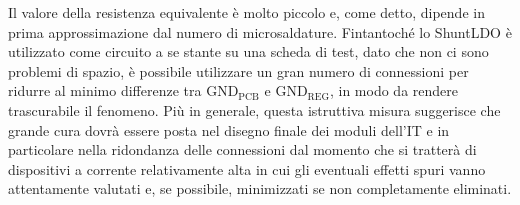 
%

Il valore della resistenza equivalente è molto piccolo e, come detto, dipende in prima approssimazione dal numero di microsaldature.
Fintantoché lo ShuntLDO è utilizzato come circuito a se stante su una scheda di test, dato che non ci sono problemi di spazio, è possibile utilizzare un gran numero di connessioni per ridurre al minimo differenze tra $\mathrm{GND_{PCB}}$ e $\mathrm{GND_{REG}}$, in modo da rendere trascurabile il fenomeno. 
Pi\`u in generale, questa istruttiva misura suggerisce che grande cura dovr\`a essere posta nel disegno finale dei moduli dell'IT e in particolare nella ridondanza delle connessioni dal momento che si tratter\`a di dispositivi a corrente relativamente alta in cui gli eventuali effetti spuri vanno attentamente valutati e, se possibile, minimizzati se non completamente eliminati.

